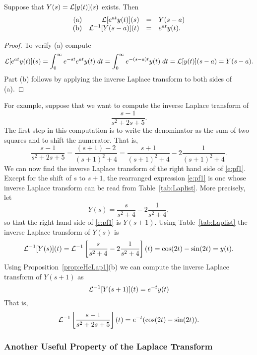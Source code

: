 \documentclass{ximera}
\begin{document}
\begin{proposition}  \label{prop:eHcLap1}
Suppose that $Y(s)={\cal L}[y(t)](s)$ exists.  Then
\[
\begin{array}{rrcl}
\mbox{(a)} & {\cal L}[e^{at}y(t)](s) & = & Y(s-a)\\
\mbox{(b)} & {\cal L}^{-1}[Y(s-a)](t) & = & e^{at}y(t).
\end{array}
\]
\end{proposition}

\begin{proof}  To verify (a) compute
\[
{\cal L}[e^{at}y(t)](s) = \int_0^{\infty} e^{-st}e^{at} y(t)\; dt
= \int_0^{\infty} e^{-(s-a)t} y(t)\; dt = {\cal L}[y(t)](s-a) = Y(s-a).
\]
Part (b) follows by applying the inverse Laplace transform to both sides 
of (a).  \end{proof}

For example, suppose that we want to compute the inverse Laplace transform of 
\begin{equation}  \label{e:exlappf}
\frac{s-1}{s^2+2s+5}.
\end{equation}
The first step in this computation is to write the denominator as the sum of 
two squares and to shift the numerator.   That is,
\begin{equation}  \label{e:pf1}
\frac{s-1}{s^2+2s+5} = \frac{(s+1)-2}{(s+1)^2+4} = 
\frac{s+1}{(s+1)^2+4} - 2\frac{1}{(s+1)^2+4}.
\end{equation}
We can now find the inverse Laplace transform of the right hand side of 
\eqref{e:pf1}.  Except for the shift of $s$ to $s+1$, the rearranged expression 
\eqref{e:pf1} is one whose inverse Laplace transform can be read from 
Table~\ref{tab:Laplist}.  More precisely, let 
\[
Y(s) = \frac{s}{s^2+4} - 2\frac{1}{s^2+4},
\]
so that the right hand side of \eqref{e:pf1} is $Y(s+1)$.  Using 
Table~\ref{tab:Laplist} the inverse Laplace transform of $Y(s)$ is
\begin{equation}  \label{e:exlappf2}
{\cal L}^{-1}[Y(s)](t) = 
{\cal L}^{-1}\left[\frac{s}{s^2+4} - 2\frac{1}{s^2+4}\right](t) = 
\cos(2t) - \sin(2t) = y(t).
\end{equation}
Using Proposition~\ref{prop:eHcLap1}(b) we can compute the inverse Laplace 
transform of $Y(s+1)$ 
as
\[
{\cal L}^{-1}[Y(s+1)](t) = e^{-t}y(t)
\]
That is,
\[
{\cal L}^{-1}\left[\frac{s-1}{s^2+2s+5}\right](t) = e^{-t}(\cos(2t)-\sin(2t)).
\]

\subsubsection*{Another Useful Property of the Laplace Transform}
\end{document}
